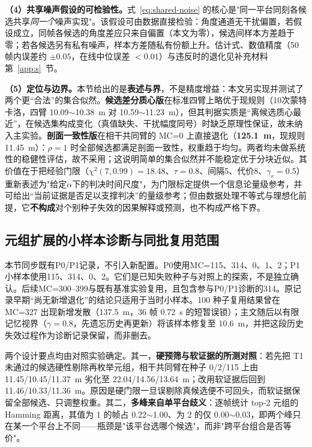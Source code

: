 \documentclass[UTF8,a4paper,zihao=-4]{ctexart}
\begin{document}
\noindent\textbf{（4）共享噪声假设的可检验性。}\quad 式~\eqref{eq:shared-noise} 的核心是"同一平台同刻各候选共享\emph{同一个}噪声实现"。该假设可由数据直接检验：角度通道无干扰偏置，若假设成立，同帧各候选的角度差应只来自偏置（本文为零），候选间样本方差趋于零；若各候选另有私有噪声，样本方差随私有份额上升。估计式、数值精度（50 帧内误差约 \(\pm0.05\)，在线中位误差 \(<0.01\)）与违反时的退化见补充材料第~\ref{app:s}~节。

\noindent\textbf{（5）定位与边界。}\quad 本节给出的是\textbf{表述与界}，不是精度增益：本文另实现并测试了两个更“合法”的集合似然。\textbf{候选差分质心版}在标准四臂上略优于现规则（10次蒙特卡洛，四臂 10.09\(\sim\)10.38~m 对 10.59\(\sim\)11.23~m），但其判据实质是“离候选质心最近”，在候选集构成变化（真值缺失、干扰幅度同号）时缺乏原理性保证，故未纳入主实验。\textbf{剖面一致性版}在相干共同臂的 MC=0 上直接退化（\textbf{125.1~m}，现规则 11.45~m）：\(\rho=1\) 时全部候选都满足剖面一致性，权重趋于均匀。两者均未做系统性的稳健性评估，故不采用；这说明简单的集合似然并不能稳定优于分块近似。其价值在于把经验门限（\(\chi^2(7,0.99)=18.48\)、\(\tau=0.8\)、间隔5、代价8、\(\gamma_v=0.5\)）重新表述为"给定\(\alpha\)下的判决时间尺度"，为门限标定提供一个信息论量级参考，并可给出“当前证据是否足以支撑判决”的量级参考；但由数据处理不等式与理想化前提，它\textbf{不构成}对个别种子失效的因果解释或预测，也不构成严格下界。




\subsection{元组扩展的小样本诊断与同批复用范围}\label{sup:tuple-audit}

本节同步既有P0/P1记录，不引入新配置。P0使用MC=115、314、0、1、2；P1小样本使用115、314、0、2。它们是已知失败种子与对照上的探索，不是独立确认。后续MC=300--399与既有基准实验复用，且包含参与P0/P1诊断的314。原记录早期“尚无新增退化”的结论只适用于当时小样本。100 种子复用结果曾在 MC=327 出现新增发散（137.5~m，36 帧 0.72~s 的短暂误锁）；主文随后以有限记忆视界（$\gamma=0.8$，先遗忘历史再更新）将该样本修复至 10.6~m，并把这段历史失效过程作为诊断记录保留，而非删去。

两个设计要点均由对照实验确定。其一，\textbf{硬预筛与软证据的所测对照}：若先把 T1 未通过的候选硬性剔除再枚举元组，相干共同臂在种子 0/2/115 上由 11.45/10.45/11.37~m 劣化至 22.04/14.56/13.64~m；改用软证据后回到 11.46/10.33/11.36~m。原因是硬门限一旦误剔除真候选便不可回头，而软证据保留全部候选、只调整权重。其二，\textbf{多峰来自单平台歧义}：逐帧统计 top-2 元组的 Hamming 距离，其值为 1 的帧占 0.22\(\sim\)1.00、为 2 的仅 0.00\(\sim\)0.03，即两个峰只在某一个平台上不同——瓶颈是"该平台选哪个候选"，而非"跨平台组合是否等价"。
\end{document}
